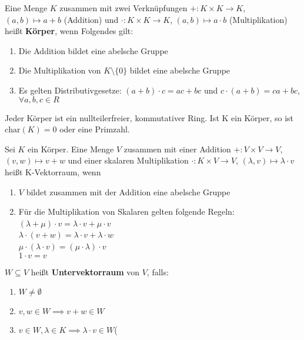 \documentclass[9pt, a4paper, twocolumn, landscape]{article}
\begin{document}
\begin{definition}
Eine Menge $K$ zusammen mit zwei Verknüpfungen 
$+ : K \times K \to K$, $(a,b) \mapsto a + b$ (Addition) und
$\cdot : K \times K \to K$, $(a,b) \mapsto a \cdot b$ (Multiplikation)
 heißt \textbf{Körper}, wenn Folgendes gilt:
\begin{enumerate}
\item Die Addition bildet eine abelsche Gruppe
\item Die Multiplikation von $K\setminus \{0\} $ bildet eine abelsche Gruppe
\item Es gelten Distributivgesetze: $ (a+b)\cdot c = ac + bc $ und $ c\cdot(a+b) = ca + bc$, $\forall a,b,c \in R$
\end{enumerate}
Jeder Körper ist ein nullteilerfreier, kommutativer Ring. Ist K ein Körper, so ist $\mathrm{char}(K) = 0$ oder eine Primzahl.
\end{definition}

\begin{definition}
Sei $K$ ein Körper. Eine Menge $V$ zusammen mit einer Addition $ + : V \times V \to V $, $(v,w) \mapsto v + w$ und einer skalaren Multiplikation  $\cdot : K \times V \to V $, $(\lambda, v) \mapsto \lambda \cdot v$ 
heißt K-Vektorraum, wenn 
\begin{enumerate}
\item $V$ bildet zusammen mit der Addition eine abelsche Gruppe
\item Für die Multiplikation von Skalaren gelten folgende Regeln:
\ \\$(\lambda + \mu) \cdot v = \lambda\cdot v + \mu\cdot v$
\ \\$\lambda \cdot (v+w) = \lambda \cdot v + \lambda \cdot w$
\ \\$\mu \cdot (\lambda\cdot v) = (\mu\cdot\lambda)\cdot v$
\ \\$1\cdot v = v$
\end{enumerate}
\end{definition}

\begin{definition}
$W \subseteq V$ heißt \textbf{Untervektorraum} von $V$, falls:
\begin{enumerate}
\item $W \neq \emptyset$
\item $v, w \in W \implies v+w \in W$ 
\item $v \in W, \lambda \in K \implies \lambda\cdot v \in W$(
\end{enumerate}
\end{definition}
\end{document}
